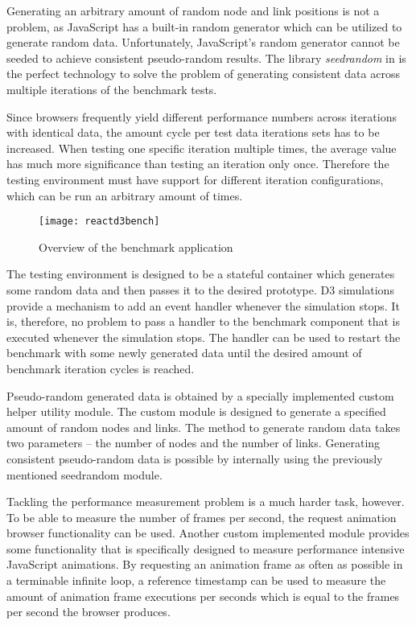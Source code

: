 Generating an arbitrary amount of random node and link positions is not a problem, as JavaScript has a built-in random generator which can be utilized to generate random data. Unfortunately, JavaScript's random generator cannot be seeded to achieve consistent pseudo-random results. The library \emph{seedrandom} in \cite{SeedRandom} is the perfect technology to solve the problem of generating consistent data across multiple iterations of the benchmark tests.

Since browsers frequently yield different performance numbers across iterations with identical data, the amount cycle per test data iterations sets has to be increased. When testing one specific iteration multiple times, the average value has much more significance than testing an iteration only once. Therefore the testing environment must have support for different iteration configurations, which can be run an arbitrary amount of times.

\begin{figure}
  \centering
  \texttt{[image: reactd3bench]}
  \caption{Overview of the benchmark application}
  \label{fig:reactD3bench1}
\end{figure}

The testing environment is designed to be a stateful container which generates some random data and then passes it to the desired prototype. D3 simulations provide a mechanism to add an event handler whenever the simulation stops. It is, therefore, no problem to pass a handler to the benchmark component that is executed whenever the simulation stops. The handler can be used to restart the benchmark with some newly generated data until the desired amount of benchmark iteration cycles is reached.

Pseudo-random generated data is obtained by a specially implemented custom helper utility module. The custom module is designed to generate a specified amount of random nodes and links. The method to generate random data takes two parameters -- the number of nodes and the number of links. Generating consistent pseudo-random data is possible by internally using the previously mentioned seedrandom module.

Tackling the performance measurement problem is a much harder task, however. To be able to measure the number of frames per second, the request animation browser functionality can be used. Another custom implemented module provides some functionality that is specifically designed to measure performance intensive JavaScript animations. By requesting an animation frame as often as possible in a terminable infinite loop, a reference timestamp can be used to measure the amount of animation frame executions per seconds which is equal to the frames per second the browser produces.

